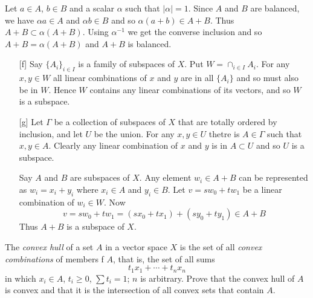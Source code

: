 \begin{enumerate}
\begin{itemize}
  Let \(a\in A\), \(b\in B\) and a scalar \(\alpha\) such that \(|\alpha|=1\).
  Since $A$ and $B$ are balanced, we have 
  \(\alpha a \in A\) and \(\alpha b \in B\)
  and so \(\alpha(a+b)\in A + B\).
  Thus \(A+B \subset \alpha(A+B)\). Using \(\alpha^{-1}\) we get the 
  converse inclusion and so 
   \(A+B = \alpha(A+B)\) and \(A+B\) is balanced.
  \begin{itemize}
   \item[{[f]}] 
        Say \(\{A_i\}_{i\in I}\) is a family of subspaces of $X$.
        Put \(W = \cap_{i\in I} A_i\).
        For any \(x,y\in W\)
        all linear combinations of $x$ and $y$ are in 
        all \(\{A_i\}\) and so must also be in $W$. Hence $W$ contains
        any linear combinations of its vectors, and so $W$ is a subspace.
   \item[{[{\small g}]}] 
        Let \(\Gamma\) be a collection of subspaces of $X$
        that are totally ordered by inclusion, and let $U$ be the union.
        For any \(x,y\in U\) thetre is \(A\in \Gamma\) such that
        \(x,y\in A\). Clearly any linear combination of $x$ and $y$
        is in \(A\subset U\) and so $U$ is a subspace.
   \item[\ich{h}] 
        Say $A$ and $B$ are subspaces of $X$.
        Any element \(w_i\in A+B\) can be represented as \(w_i=x_i+y_i\)
        where \(x_i\in A\) and \(y_i\in B\).
        Let \(v = s w_0 + t w_1\) be a linear combination of \(w_i\in W\).
        Now 
        \begin{equation*}
         v = s w_0 + t w_1 = (sx_0 + tx_1) + (sy_0 + ty_1) \in A + B
        \end{equation*}
        Thus \(A+B\) is a subspace of $X$.
  
  \end{itemize}
\end{itemize}

\begin{excopy}
The
\emph{convex hull} of a set $A$ in a vector space $X$ is the set of all
\emph{convex combinations} of members f $A$, that is, the set of all sums
\begin{equation*}
  t_1 x_1 + \cdots + t_n x_n
\end{equation*}
in which
\(x_i\in A\),
\(t_i\geq 0\),
\(\sum t_i = 1\);
$n$ is arbitrary. Prove that the convex hull of $A$ is convex
and that it is the intersection of all convex sets that contain $A$.
\end{excopy}


\end{enumerate}
